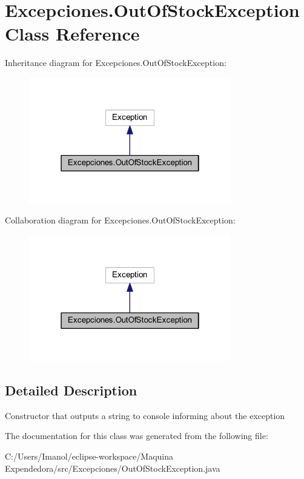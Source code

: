 \hypertarget{class_excepciones_1_1_out_of_stock_exception}{}\section{Excepciones.\+Out\+Of\+Stock\+Exception Class Reference}
\label{class_excepciones_1_1_out_of_stock_exception}


Inheritance diagram for Excepciones.\+Out\+Of\+Stock\+Exception\+:
\nopagebreak
\begin{figure}[H]
\begin{center}
\leavevmode
\includegraphics[width=250pt]{class_excepciones_1_1_out_of_stock_exception__inherit__graph}
\end{center}
\end{figure}


Collaboration diagram for Excepciones.\+Out\+Of\+Stock\+Exception\+:
\nopagebreak
\begin{figure}[H]
\begin{center}
\leavevmode
\includegraphics[width=250pt]{class_excepciones_1_1_out_of_stock_exception__coll__graph}
\end{center}
\end{figure}


\subsection{Detailed Description}
Constructor that outputs a string to console informing about the exception 

The documentation for this class was generated from the following file\+:\begin{DoxyCompactItemize}
\item 
C\+:/\+Users/\+Imanol/eclipse-\/workspace/\+Maquina Expendedora/src/\+Excepciones/Out\+Of\+Stock\+Exception.\+java\end{DoxyCompactItemize}
